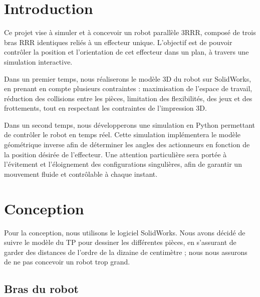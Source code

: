 \documentclass[a4paper, 11pt]{report}
\begin{document}

\clearpage\setcounter{page}{2}

\tableofcontents

\section*{Introduction}

Ce projet vise à simuler et à concevoir un robot parallèle 3RRR, composé de trois bras RRR identiques reliés à un effecteur unique. L'objectif est de pouvoir contrôler la position et l'orientation de cet effecteur dans un plan, à travers une simulation interactive.

Dans un premier temps, nous réaliserons le modèle 3D du robot sur SolidWorks, en prenant en compte plusieurs contraintes : maximisation de l'espace de travail, réduction des collisions entre les pièces, limitation des flexibilités, des jeux et des frottements, tout en respectant les contraintes de l'impression 3D.

Dans un second temps, nous développerons une simulation en Python permettant de contrôler le robot en temps réel. Cette simulation implémentera le modèle géométrique inverse afin de déterminer les angles des actionneurs en fonction de la position désirée de l'effecteur. Une attention particulière sera portée à l'évitement et l'éloignement des configurations singulières, afin de garantir un mouvement fluide et contrôlable à chaque instant.

\section{Conception}

Pour la conception, nous utilisons le logiciel SolidWorks. Nous avons décidé de suivre le modèle du TP pour dessiner les différentes pièces, 
en s'assurant de garder des distances de l'ordre de la dizaine de centimètre ; nous nous assurons de ne pas concevoir un robot trop grand.

\subsection{Bras du robot}
\end{document}
